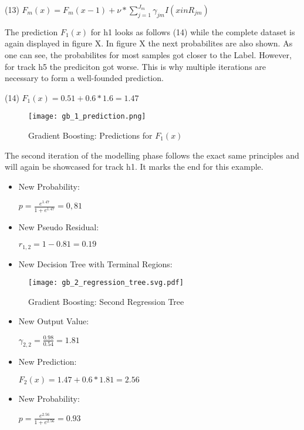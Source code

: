 (13) \(F_{m}(x) = F_{m}(x- 1) + \nu * \sum_{j = 1}^{J_{m}} \gamma_{jm}I(x in R_{jm}) \)

The prediction \(F_{1}(x)\) for h1 looks as follows (14) while the complete dataset is again displayed in figure X. In figure X
the next probabilites are also shown. As one can see, the probabilites for most samples got closer to the Label. However, for track
h5 the prediciton got worse. This is why multiple iterations are necessary to form a well-founded prediction. 

(14) \(F_{1}(x) = 0.51 + 0.6 * 1.6 = 1.47 \)

\begin{figure}[H]
    \centering
    \caption[]{Gradient Boosting: Predictions for \(F_{1}(x)\)}
	\label{gb_1_prediction}
    \texttt{[image: gb\_1\_prediction.png]}
\end{figure}

The second iteration of the modelling phase follows the exact same principles and will again be showcased for track h1. 
It marks the end for this example. 

\begin{itemize}

    \item New Probability:

\(p = \frac{e^{1.47}}{1 + e^{1.47}} = 0,81 \)

    \item New Pseudo Residual: 

\(r_{1, 2} = 1 - 0.81 = 0.19 \)

    \item New Decision Tree with Terminal Regions:

\end{itemize}

\begin{figure}[H]
    \centering
    \caption[]{Gradient Boosting: Second Regression Tree}
	\label{gb_2_regression_tree}
    \texttt{[image: gb\_2\_regression\_tree.svg.pdf]}
\end{figure}

\begin{itemize}

    \item New Output Value: 

\(\gamma_{2,2} = \frac{0.98}{0.54} = 1.81 \)

    \item New Prediction:

\(F_{2}(x) = 1.47 + 0.6 * 1.81 = 2.56\)

    \item New Probability:

\(p = \frac{e^{2.56}}{1 + e^{2.56}} = 0.93 \)

\end{itemize}

